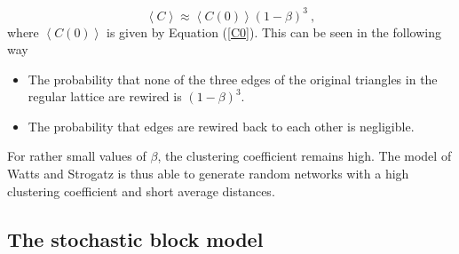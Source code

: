 \documentclass[11 pt , letterpaper , twoside , openright]{book}
\begin{document}
\begin{equation}
	\left<C\right> \approx \left<C(0)\right>(1-\beta)^3 \ ,
\end{equation} 
where $\left<C(0)\right>$ is given by Equation (\ref{C0}). This can be seen in the following way
\begin{itemize}
	\item The probability that none of the three edges of the original triangles in the regular lattice are rewired is $(1-\beta)^3$.
	\item The probability that edges are rewired back to each other is negligible.
\end{itemize}
For rather small values of $\beta$, the clustering coefficient remains high. The model of Watts and Strogatz is thus able to generate random networks with a high clustering coefficient and short average distances.


\subsection{The stochastic block model}
\end{document}
